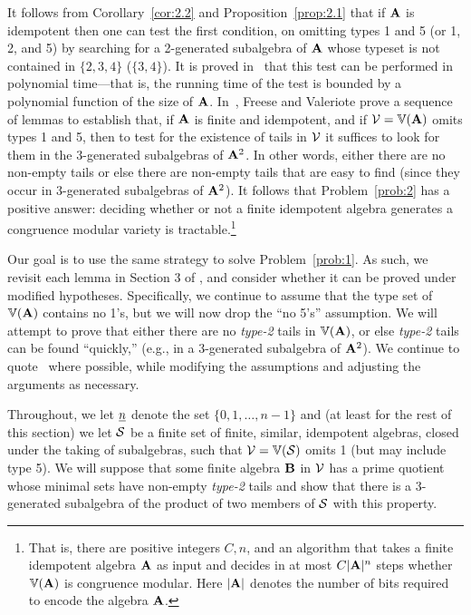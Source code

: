 It follows from Corollary~\ref{cor:2.2} and Proposition~\ref{prop:2.1}
that if $\mathbf{A}$ is idempotent then one can
test the first condition, on omitting types 1 and 5 (or 1, 2, and 5) by searching
for a 2-generated subalgebra of $\mathbf{A}$ whose typeset is not contained in
$\{2, 3, 4\}$ ($\{3, 4\}$). It is proved in~\cite[Sec.~6]{Freese:2009} that this
test can be performed in polynomial time---that is, the running time of the test
is bounded by a polynomial function of the size of $\mathbf{A}$.
In~\cite[Sec.~3]{Freese:2009}, Freese and Valeriote prove a sequence of
lemmas to establish that, if $\mathbf{A}$ is finite and idempotent, and if
$\mathcal{V} = \operatorname{\mathbb{V}}(\mathbf{A})$ omits types 1 and 5, then to test for the existence of tails
in $\mathcal{V}$ it suffices to look for them 
in the 3-generated subalgebras of $\mathbf{A}^2$.
In other words, either there are no non-empty tails
or else there are non-empty tails that are easy to find
(since they occur in 3-generated subalgebras of $\mathbf{A}^2$).
It follows that Problem~\ref{prob:2} has a positive answer:
deciding whether or not a finite idempotent algebra generates a congruence
modular variety is tractable.\footnote{That is, there are positive integers
  $C, n$, and an algorithm that takes
  a finite idempotent algebra $\mathbf{A}$ as input and decides
  in at most $C|\mathbf{A}|^n$ steps whether $\operatorname{\mathbb{V}}(\mathbf{A})$ is congruence modular.
  Here $|\mathbf{A}|$ denotes the number of bits required to encode the algebra $\mathbf{A}$.}

Our goal is to use the same strategy to solve Problem~\ref{prob:1}.
As such, we revisit each lemma in Section 3 of \cite{Freese:2009},
and consider whether it can be proved under modified hypotheses.
Specifically, we continue to assume that the type set of $\operatorname{\mathbb{V}}(\mathbf{A})$ contains no 1's,
but we will now drop the ``no 5's'' assumption.  We will attempt to prove that
either there are no \emph{type-2} tails in $\operatorname{\mathbb{V}}(\mathbf{A})$, or else \emph{type-2}
tails can be found ``quickly,'' (e.g., in a 3-generated subalgebra of $\mathbf{A}^2$).
We continue to quote~\cite{Freese:2009} where possible,
while modifying the assumptions and adjusting the arguments as necessary.


Throughout, we let $\underline{n}$ denote the set $\{0,1,\dots, n-1\}$ and 
(at least for the rest of this section) we let $\mathcal{S}$ be a finite set of finite,
similar, idempotent algebras, closed under the taking of subalgebras, such that
$\mathcal{V} = \operatorname{\mathbb{V}}(\mathcal{S})$ omits 1 (but may include type 5).
We will suppose that some finite algebra
$\mathbf{B}$ in $\mathcal{V}$ has a prime quotient whose minimal sets have non-empty
\emph{type-2} tails and show that there is a 3-generated subalgebra of the
product of two members of $\mathcal{S}$ with this property.

